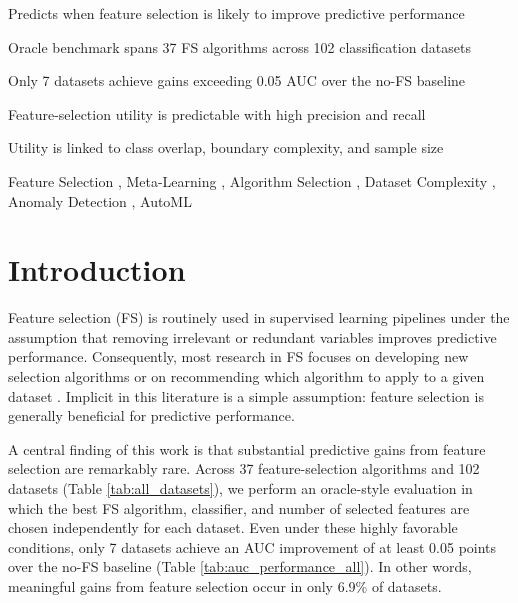 \documentclass[preprint,12pt,authoryear]{elsarticle}
\begin{document}
\begin{frontmatter}
\begin{highlights}
\item Predicts when feature selection is likely to improve predictive performance
\item Oracle benchmark spans 37 FS algorithms across 102 classification datasets
\item Only 7 datasets achieve gains exceeding 0.05 AUC over the no-FS baseline
\item Feature-selection utility is predictable with high precision and recall
\item Utility is linked to class overlap, boundary complexity, and sample size
\end{highlights}

\begin{keyword}
Feature Selection \sep
Meta-Learning \sep
Algorithm Selection \sep
Dataset Complexity \sep
Anomaly Detection \sep
AutoML
\end{keyword}

\end{frontmatter}



\section{Introduction}
\label{sec:introduction}

Feature selection (FS) is routinely used in supervised learning pipelines under the assumption that removing irrelevant or redundant variables improves predictive performance. Consequently, most research in FS focuses on developing new selection algorithms or on recommending which algorithm to apply to a given dataset \citep{guyon2003introduction,li2017feature,jiao2023survey}. Implicit in this literature is a simple assumption: feature selection is generally beneficial for predictive performance.

A central finding of this work is that substantial predictive gains from feature selection are remarkably rare. Across 37 feature-selection algorithms and 102 datasets (Table \ref{tab:all_datasets}), we perform an oracle-style evaluation in which the best FS algorithm, classifier, and number of selected features are chosen independently for each dataset. Even under these highly favorable conditions, only 7 datasets achieve an AUC improvement of at least 0.05 points over the no-FS baseline (Table \ref{tab:auc_performance_all}). In other words, meaningful gains from feature selection occur in only 6.9\% of datasets.
\end{document}
